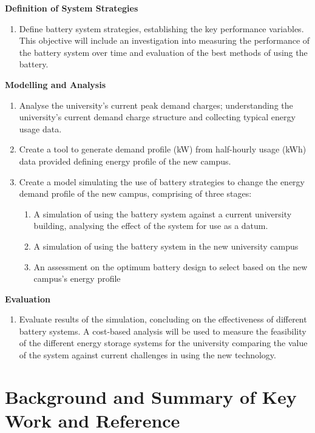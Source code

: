 \textbf{Definition of System Strategies}

\begin{enumerate}[resume]
\item Define battery system strategies, establishing the key performance variables. This objective will include an investigation into measuring the performance of the battery system over time and evaluation of the best methods of using the battery.
\end{enumerate}

\textbf{Modelling and Analysis}

\begin{enumerate}[resume]
\item Analyse the university’s current peak demand charges; understanding the university’s current demand charge structure and collecting typical energy usage data.  
\item Create a tool to generate demand profile (kW) from half-hourly usage (kWh) data provided defining energy profile of the new campus.
\item Create a model simulating the use of battery strategies to change the energy demand profile of the new campus, comprising of three stages:
\begin{enumerate}
\item A simulation of using the battery system against a current university building, analysing the effect of the system for use as a datum.
\item A simulation of using the battery system in the new university campus
\item An assessment on the optimum battery design to select based on the new campus's energy profile
\end{enumerate}
\end{enumerate}

\textbf{Evaluation}

\begin{enumerate}[resume]
\item Evaluate results of the simulation, concluding on the effectiveness of different battery systems. A cost-based analysis will be used to measure the feasibility of the different energy storage systems for the university comparing the value of the system against current challenges in using the new technology.
\end{enumerate}

\section{Background and Summary of Key Work and
Reference}\label{background-and-summary-of-key-work-and-reference}

